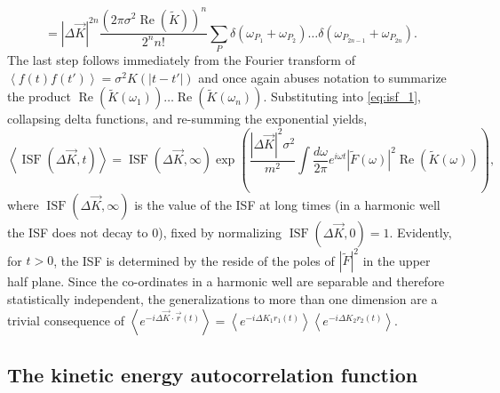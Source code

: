 \documentclass[7pt]{article}
\newcommand*{\ISF}{\operatorname{ISF}}
\renewcommand*{\Re}{\operatorname{Re}}
\begin{document}
\begin{equation}
= \left|\Delta \vec{K}\right|^{2n} \frac{\left(2\pi\sigma^2\Re(\tilde{K})\right)^n}{2^nn!} \sum_P \delta\left(\omega_{P_1} + \omega_{P_2}\right) \ldots \delta\left(\omega_{P_{2n-1}} + \omega_{P_{2n}}\right).
\end{equation}
The last step follows immediately from the Fourier transform of $\left<f(t)f(t')\right>=\sigma^2 K(|t-t'|)$ and once again abuses notation to summarize the product $\Re(\tilde{K}(\omega_1)) \ldots \Re(\tilde{K}(\omega_n))$. Substituting into \ref{eq:isf_1}, collapsing delta functions, and re-summing the exponential yields,
\begin{equation}
	\left<\ISF(\Delta \vec{K}, t)\right> = \ISF\left(\Delta \vec{K}, \infty\right) \exp\left(\frac{|\Delta \vec{K}|^2 \sigma^2}{m^2} \int \frac{d\omega}{2\pi} e^{i \omega t} \left| \tilde{F}(\omega) \right|^2 \Re(\tilde{K}(\omega)) \right), 
\end{equation}
where $\ISF\left(\Delta \vec{K}, \infty\right)$ is the value of the ISF at long times (in a harmonic well the ISF does not decay to 0), fixed by normalizing $\ISF(\Delta \vec{K}, 0)=1$. Evidently, for $t>0$, the ISF is determined by the reside of the poles of $|\tilde{F}|^2$ in the upper half plane. Since the co-ordinates in a harmonic well are separable and therefore statistically independent, the generalizations to more than one dimension are a trivial consequence of $\left<e^{-i\Delta\vec{K}\cdot\vec{r}(t)}\right>=\left<e^{-i\Delta{K}_1 r_1(t)}\right>\left<e^{-i\Delta{K}_2 r_2(t)}\right>$. 

\subsection{The kinetic energy autocorrelation function}
\end{document}
